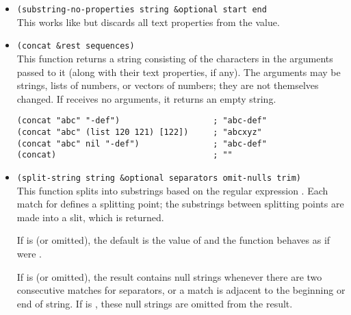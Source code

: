 \begin{itemize}[itemsep=10pt]
  If the characters copied from  have text properties, the properties are copied into the new string also
\begin{lstlisting}
(substring "abcdefg" 0 3)               ; "abc"
(substring "abcdefg" -3 -1)             ; "ef"
(substring "abcdefg" -3 nil)            ; "efg"
(substring "abcdefg" 0)                 ; "abcdefg"
\end{lstlisting}
\item \lstinline|(substring-no-properties string &optional start end|\\
  This works like  but discards all text properties from the value.
\item \lstinline|(concat &rest sequences)|\\
  This function returns a string consisting of the characters in the arguments passed to it (along with their text properties, if any).
  The arguments may be strings, lists of numbers, or vectors of numbers; they are not themselves changed.
  If  receives no arguments, it returns an empty string.
\begin{lstlisting}
(concat "abc" "-def")                   ; "abc-def"
(concat "abc" (list 120 121) [122])     ; "abcxyz"
(concat "abc" nil "-def")               ; "abc-def"
(concat)                                ; ""
\end{lstlisting}
\item \lstinline|(split-string string &optional separators omit-nulls trim)|\\
  This function splits  into substrings based on the regular expression .
  Each match for  defines a splitting point; the substrings between splitting points are made into a slit, which is returned.

  If  is  (or omitted), the default is the value of  and the function behaves as if  were .
  
  If  is  (or omitted), the result contains null strings whenever there are two consecutive matches for separators, or a match is adjacent to the beginning or end of string.
  If  is , these null strings are omitted from the result.


\end{itemize}
